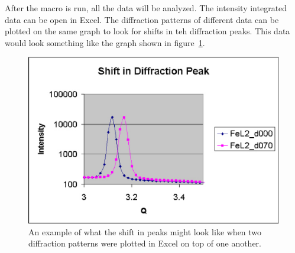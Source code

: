 After the macro is run, all the data will be analyzed. The
intensity integrated data can be open in Excel. 
The diffraction patterns of different data can be plotted on
the same graph to look for shifts in teh diffraction peaks. 
This data would look something like the graph shown
in figure~\ref{excel_peak_shift}.

\begin{figure}
    \centering
    \includegraphics[scale=.5]
    {figures/excel_peak_shift.eps}
    \caption{An example of what the shift in peaks might
    look like when two diffraction patterns were plotted
    in Excel on top of one another.}
    \label{excel_peak_shift}
\end{figure}
